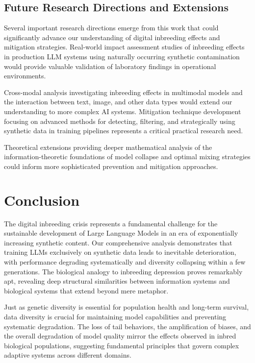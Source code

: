 \documentclass{article}
\begin{document}
\subsection{Future Research Directions and Extensions}

Several important research directions emerge from this work that could significantly advance our understanding of digital inbreeding effects and mitigation strategies. Real-world impact assessment studies of inbreeding effects in production LLM systems using naturally occurring synthetic contamination would provide valuable validation of laboratory findings in operational environments.

Cross-modal analysis investigating inbreeding effects in multimodal models and the interaction between text, image, and other data types would extend our understanding to more complex AI systems. Mitigation technique development focusing on advanced methods for detecting, filtering, and strategically using synthetic data in training pipelines represents a critical practical research need.

Theoretical extensions providing deeper mathematical analysis of the information-theoretic foundations of model collapse and optimal mixing strategies could inform more sophisticated prevention and mitigation approaches.

\section{Conclusion}

The digital inbreeding crisis represents a fundamental challenge for the sustainable development of Large Language Models in an era of exponentially increasing synthetic content. Our comprehensive analysis demonstrates that training LLMs exclusively on synthetic data leads to inevitable deterioration, with performance degrading systematically and diversity collapsing within a few generations. The biological analogy to inbreeding depression proves remarkably apt, revealing deep structural similarities between information systems and biological systems that extend beyond mere metaphor.

Just as genetic diversity is essential for population health and long-term survival, data diversity is crucial for maintaining model capabilities and preventing systematic degradation. The loss of tail behaviors, the amplification of biases, and the overall degradation of model quality mirror the effects observed in inbred biological populations, suggesting fundamental principles that govern complex adaptive systems across different domains.
\end{document}
